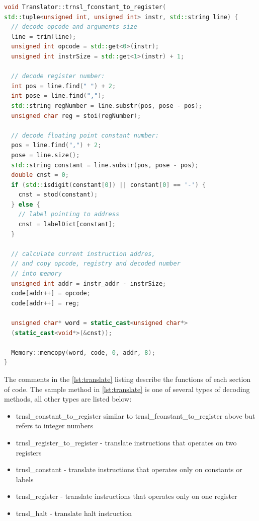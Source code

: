 \documentclass[oneside]{book}
\begin{document}
\begin{lstlisting}[caption=Translate instruction, label={lst:translate}, language=C++, style=customc]
void Translator::trnsl_fconstant_to_register(
std::tuple<unsigned int, unsigned int> instr, std::string line) {
  // decode opcode and arguments size
  line = trim(line);
  unsigned int opcode = std::get<0>(instr);
  unsigned int instrSize = std::get<1>(instr) + 1;

  // decode register number:
  int pos = line.find(" ") + 2;
  int pose = line.find(",");
  std::string regNumber = line.substr(pos, pose - pos);
  unsigned char reg = stoi(regNumber);

  // decode floating point constant number:
  pos = line.find(",") + 2;
  pose = line.size();
  std::string constant = line.substr(pos, pose - pos);
  double cnst = 0;
  if (std::isdigit(constant[0]) || constant[0] == '-') {
    cnst = stod(constant);
  } else {
    // label pointing to address
    cnst = labelDict[constant];
  }

  // calculate current instruction addres, 
  // and copy opcode, registry and decoded number 
  // into memory
  unsigned int addr = instr_addr - instrSize;
  code[addr++] = opcode;
  code[addr++] = reg;

  unsigned char* word = static_cast<unsigned char*>
  (static_cast<void*>(&cnst));
    
  Memory::memcopy(word, code, 0, addr, 8);
}
\end{lstlisting}

The comments in the \ref{lst:translate} listing describe the functions of each section of code.
The sample method in \ref{lst:translate} is one of several types of decoding methods, all other types are listed below:

\begin{itemize}

\item trnsl\_constant\_to\_register similar to trnsl\_fconstant\_to\_register above but refers to integer numbers
\item trnsl\_register\_to\_register - translate instructions that operates on two registers
\item trnsl\_constant - translate instructions that operates only on constants or labels
\item trnsl\_register - translate instructions that operates only on one register
\item trnsl\_halt - translate halt instruction

\end{itemize}
\end{document}
